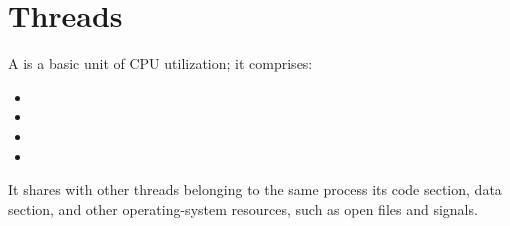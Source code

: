 
\chapter{Threads}

  \par A  is a basic unit of CPU utilization; it comprises:
  \begin{itemize}
    \item {}
    \item {}
    \item {}
    \item {}
  \end{itemize}
  \par  It shares with other threads belonging to the same process its code section, data section, and other operating-system resources, such as open files and signals.